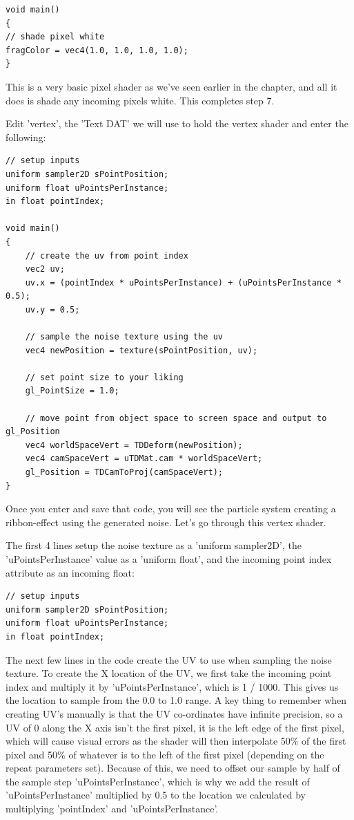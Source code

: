 \begin{fullwidth}
\begin{lstlisting}
void main()
{
// shade pixel white
fragColor = vec4(1.0, 1.0, 1.0, 1.0);
}
\end{lstlisting}

This is a very basic pixel shader as we've seen earlier in the chapter, and all it does is shade any incoming pixels white. This completes step 7.

Edit 'vertex', the 'Text DAT' we will use to hold the vertex shader and enter the following:

\begin{lstlisting}
// setup inputs
uniform sampler2D sPointPosition;
uniform float uPointsPerInstance;
in float pointIndex;

void main()
{
    // create the uv from point index
    vec2 uv;
    uv.x = (pointIndex * uPointsPerInstance) + (uPointsPerInstance * 0.5);
    uv.y = 0.5;

    // sample the noise texture using the uv
    vec4 newPosition = texture(sPointPosition, uv);

    // set point size to your liking
    gl_PointSize = 1.0;

    // move point from object space to screen space and output to gl_Position
    vec4 worldSpaceVert = TDDeform(newPosition);
    vec4 camSpaceVert = uTDMat.cam * worldSpaceVert;
    gl_Position = TDCamToProj(camSpaceVert);
}
\end{lstlisting}

Once you enter and save that code, you will see the particle system creating a ribbon-effect using the generated noise. Let's go through this vertex shader.

The first 4 lines setup the noise texture as a 'uniform sampler2D', the 'uPointsPerInstance' value as a 'uniform float', and the incoming point index attribute as an incoming float:

\begin{lstlisting}
// setup inputs
uniform sampler2D sPointPosition;
uniform float uPointsPerInstance;
in float pointIndex;
\end{lstlisting}

The next few lines in the code create the UV to use when sampling the noise texture. To create the X location of the UV, we first take the incoming point index and multiply it by 'uPointsPerInstance', which is 1 / 1000. This gives us the location to sample from the 0.0 to 1.0 range. A key thing to remember when creating UV's manually is that the UV co-ordinates have infinite precision, so a UV of 0 along the X axis isn't the first pixel, it is the left edge of the first pixel, which will cause visual errors as the shader will then interpolate 50\% of the first pixel and 50\% of whatever is to the left of the first pixel (depending on the repeat parameters set). Because of this, we need to offset our sample by half of the sample step 'uPointsPerInstance', which is why we add the result of 'uPointsPerInstance' multiplied by 0.5 to the location we calculated by multiplying 'pointIndex' and 'uPointsPerInstance'.


\end{fullwidth}
